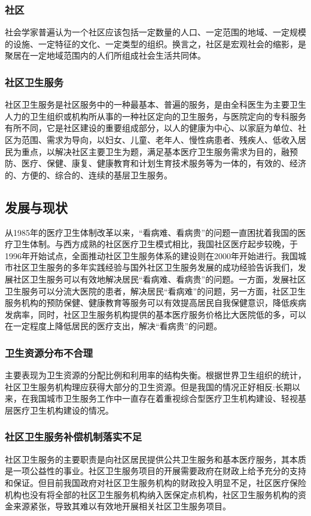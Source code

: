 \subsubsection{社区}社会学家普遍认为一个社区应该包括一定数量的人口、一定范围的地域、一定规模的设施、一定特征的文化、一定类型的组织。换言之，社区是宏观社会的缩影，是聚居在一定地域范围内的人们所组成社会生活共同体。
\subsubsection{社区卫生服务}
社区卫生服务是社区服务中的一种最基本、普遍的服务，是由全科医生为主要卫生人力的卫生组织或机构所从事的一种社区定向的卫生服务，与医院定向的专科服务有所不同，它是社区建设的重要组成部分，以人的健康为中心、以家庭为单位、社区为范围、需求为导向，以妇女、儿童、老年人、慢性病患者、残疾人、低收入居民为重点，以解决社区主要卫生为题，满足基本医疗卫生服务需求为目的，融预防、医疗、保健、康复、健康教育和计划生育技术服务等为一体的，有效的、经济的、方便的、综合的、连续的基层卫生服务。 
\subsection{发展与现状}
从1985年的医疗卫生体制改革以来，“看病难、看病贵”的问题一直困扰着我国的医疗卫生体制。与西方成熟的社区医疗卫生模式相比，我国社区医疗起步较晚，于1996年开始试点，全面推动社区卫生服务体系的建设则在2000年开始进行。我国城市社区卫生服务的多年实践经验与国外社区卫生服务发展的成功经验告诉我们，发展社区卫生服务可以有效地解决居民“看病难、看病贵”的问题。一方面，发展社区卫生服务可以分流大医院的患者，解决居民“看病难”的问题，另一方面，社区卫生服务机构的预防保健、健康教育等服务可以有效提高居民自我保健意识，降低疾病发病率，同时，社区卫生服务机构提供的基本医疗服务价格比大医院低的多，可以在一定程度上降低居民的医疗支出，解决“看病贵”的问题。
\subsubsection{卫生资源分布不合理}
主要表现为卫生资源的分配比例和利用率的结构失衡。根据世界卫生组织的统计，社区卫生服务机构理应获得大部分的卫生资源。但是我国的情况正好相反:长期以来，在我国城市卫生服务工作中一直存在着重视综合型医疗卫生机构建设、轻视基层医疗卫生机构建设的情况。
\subsubsection{社区卫生服务补偿机制落实不足}
社区卫生服务的主要职责是向社区居民提供公共卫生服务和基本医疗服务，其本质是一项公益性的事业。社区卫生服务项目的开展需要政府在财政上给予充分的支持和保证。但目前我国政府对社区卫生服务机构的财政投入明显不足，社区医疗保险机构也没有将全部的社区卫生服务机构纳入医保定点机构，社区卫生服务机构的资金来源紧张，导致其难以有效地开展相关社区卫生服务项目。
